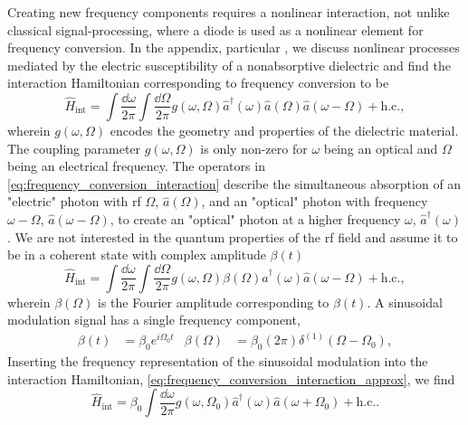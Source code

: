 Creating new frequency components requires a nonlinear interaction, not unlike classical signal-processing, where a diode is used as a nonlinear element for frequency conversion.
In the appendix, particular , we discuss nonlinear processes mediated by the electric susceptibility of a nonabsorptive dielectric and find the
interaction Hamiltonian corresponding to frequency conversion to be
\begin{equation}
	\hat{H}_\text{int}
	=
	\int\frac{\dd{\omega}}{2\pi}
	\int\frac{\dd{\Omega}}{2\pi}
	g(\omega,\Omega)
	\hat{a}^\dagger(\omega)
	\hat{a}(\Omega)
	\hat{a}(\omega-\Omega)
	+
	\text{h.c.}
	\label{eq:frequency_conversion_interaction}
	,
\end{equation}
wherein $g(\omega,\Omega)$ encodes the geometry and properties of the dielectric material.
The coupling parameter $g(\omega,\Omega)$ is only non-zero for $\omega$ being an optical and $\Omega$ being an electrical frequency.
The operators in \cref{eq:frequency_conversion_interaction} describe the simultaneous absorption of an "electric" photon with \gls{rf} $\Omega$, $\hat{a}(\Omega)$, and an "optical" photon with frequency $\omega-\Omega$, $\hat{a}(\omega-\Omega)$, to create an "optical" photon at a higher frequency $\omega$, $\hat{a}^\dagger(\omega)$.
We are not interested in the quantum properties of the \gls{rf} field and assume it to be in a coherent state with complex amplitude $\beta(t)$
\begin{equation}
	\hat{H}_\text{int}
	=
	\int\frac{\dd{\omega}}{2\pi}
	\int\frac{\dd{\Omega}}{2\pi}
	g(\omega,\Omega)
	\beta(\Omega)
	\hat{a}^\dagger(\omega)
	\hat{a}(\omega-\Omega)
	+
	\text{h.c.}
	,
	\label{eq:frequency_conversion_interaction_approx}
\end{equation}
wherein $\beta(\Omega)$ is the Fourier amplitude corresponding to $\beta(t)$.
A sinusoidal modulation signal has a single frequency component,
\begin{align}
	\beta(t)
	&=
	\beta_0
	e^{i\Omega_0t}
	&
	\beta(\Omega)
	&=
	\beta_0
	(2\pi)
	\delta^{(1)}(\Omega-\Omega_0)
	,
\end{align}
Inserting the frequency representation of the sinusoidal modulation into the interaction Hamiltonian, \cref{eq:frequency_conversion_interaction_approx}, we find
\begin{equation}
	\hat{H}_\text{int}
	=
	\beta_0
	\int\frac{\dd{\omega}}{2\pi}
	g(\omega,\Omega_0)
	\hat{a}^\dagger(\omega)
	\hat{a}(\omega+\Omega_0)
	+
	\text{h.c.}
	\label{eq:frequency_conversion_interaction_sinusoidal}
	.
\end{equation}
